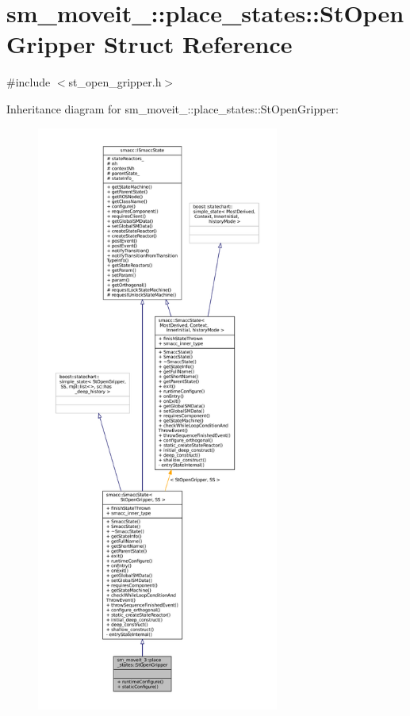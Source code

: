 \hypertarget{structsm__moveit__3_1_1place__states_1_1StOpenGripper}{}\section{sm\+\_\+moveit\+\_\+:\+:place\+\_\+states\+:\+:St\+Open\+Gripper Struct Reference}
\label{structsm__moveit__3_1_1place__states_1_1StOpenGripper}


{\ttfamily \#include $<$st\+\_\+open\+\_\+gripper.\+h$>$}



Inheritance diagram for sm\+\_\+moveit\+\_\+:\+:place\+\_\+states\+:\+:St\+Open\+Gripper\+:
\nopagebreak
\begin{figure}[H]
\begin{center}
\leavevmode
\includegraphics[height=550pt]{structsm__moveit__3_1_1place__states_1_1StOpenGripper__inherit__graph}
\end{center}
\end{figure}


